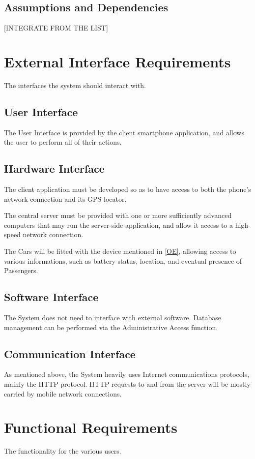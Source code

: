 \documentclass[12pt]{article}
\begin{document}
\subsection{Assumptions and Dependencies}
[INTEGRATE FROM THE LIST]

\clearpage\section{External Interface Requirements}
The interfaces the system should interact with.
\subsection{User Interface}
The User Interface is provided by the client smartphone application, and allows the user to perform all of their actions.
\subsection{Hardware Interface}
The client application must be developed so as to have access to both the phone's network connection and its GPS locator.

The central server must be provided with one or more sufficiently advanced computers that may run the server-side application, and allow it access to a high-speed network connection.

The Cars will be fitted with the device mentioned in \ref{OE}, allowing access to various informations, such as battery status, location, and eventual presence of Passengers.
\subsection{Software Interface}
The System does not need to interface with external software. Database management can be performed via the Administrative Access function.
\subsection{Communication Interface}
As mentioned above, the System heavily uses Internet communications protocols, mainly the HTTP protocol. HTTP requests to and from the server will be mostly carried by mobile network connections.

\clearpage\section{Functional Requirements}
The functionality for the various users.
\end{document}
